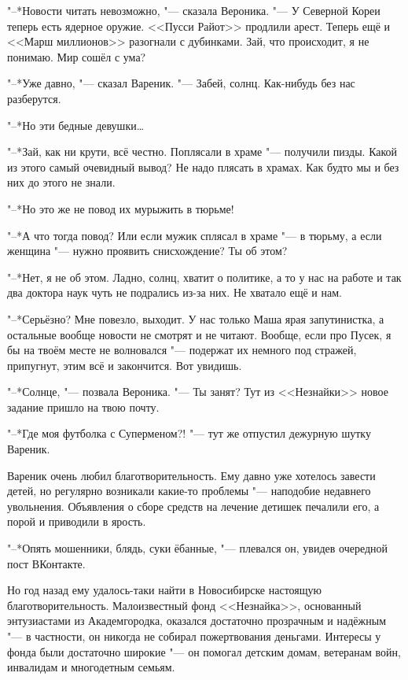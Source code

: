 \asterism

\label{Thu_2012_05_10}

"--*Новости читать невозможно, "--- сказала Вероника.
"--- У Северной Кореи теперь есть ядерное оружие.
<<Пусси Райот>> продлили арест.
Теперь ещё и <<Марш миллионов>> разогнали с дубинками.
Зай, что происходит, я не понимаю.
Мир сошёл с ума?

"--*Уже давно, "--- сказал Вареник.
"--- Забей, солнц.
Как-нибудь без нас разберутся.

"--*Но эти бедные девушки\dots{}

"--*Зай, как ни крути, всё честно.
Поплясали в храме "--- получили пизды.
Какой из этого самый очевидный вывод?
Не надо плясать в храмах.
Как будто мы и без них до этого не знали.

"--*Но это же не повод их мурыжить в тюрьме!

"--*А что тогда повод?
Или если мужик сплясал в храме "--- в тюрьму, а если женщина "--- нужно проявить снисхождение?
Ты об этом?

"--*Нет, я не об этом.
Ладно, солнц, хватит о политике, а то у нас на работе и так два доктора наук чуть не подрались из-за них.
Не хватало ещё и нам.

"--*Серьёзно?
Мне повезло, выходит.
У нас только Маша ярая запутинистка, а остальные вообще новости не смотрят и не читают.
Вообще, если про Пусек, я бы на твоём месте не волновался "--- подержат их немного под стражей, припугнут, этим всё и закончится.
Вот увидишь.

\textspace

"--*Солнце, "--- позвала Вероника.
"--- Ты занят?
Тут из <<Незнайки>> новое задание пришло на твою почту.

"--*Где моя футболка с Суперменом?! "--- тут же отпустил дежурную шутку Вареник.

Вареник очень любил благотворительность.
Ему давно уже хотелось завести детей, но регулярно возникали какие-то проблемы "--- наподобие недавнего увольнения.
Объявления о сборе средств на лечение детишек печалили его, а порой и приводили в ярость.

"--*Опять мошенники, блядь, суки ёбанные, "--- плевался он, увидев очередной пост ВКонтакте.

Но год назад ему удалось-таки найти в Новосибирске настоящую благотворительность.
Малоизвестный фонд <<Незнайка>>, основанный энтузиастами из Академгородка, оказался достаточно прозрачным и надёжным "--- в частности, он никогда не собирал пожертвования деньгами.
Интересы у фонда были достаточно широкие "--- он помогал детским домам, ветеранам войн, инвалидам и многодетным семьям.

